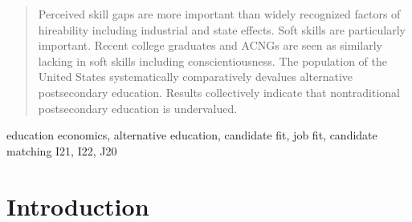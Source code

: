 \documentclass[review]{elsarticle}
\begin{document}
\begin{frontmatter}
\begin{abstract}
        Perceived skill gaps are more important than widely recognized factors of hireability including industrial and state effects.
        Soft skills are particularly important.
        Recent college graduates and ACNGs are seen as similarly lacking in soft skills including conscientiousness.
        The population of the United States systematically comparatively devalues alternative postsecondary education.
        Results collectively indicate that nontraditional postsecondary education is undervalued.
    \end{abstract}

    \begin{keyword}
        education economics, alternative education, candidate fit, job fit, candidate matching     %
        \MSC[2010] I21, I22, J20                                                                   %
    \end{keyword}

\end{frontmatter}

\pagebreak
\linenumbers

\section{Introduction}


\end{document}
